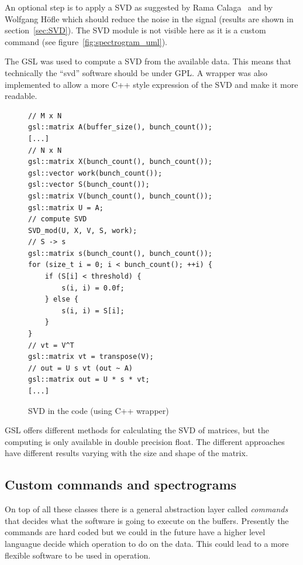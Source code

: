 An optional step is to apply a \gls{SVD} as suggested by Rama Calaga~\cite{PhysRevSTAB.7.042801} and by Wolfgang H{\"o}f\/le\cite{HofleChamonix12} which should reduce the noise in the signal (results are shown in section~\ref{sec:SVD}). The \gls{SVD} module is not visible here as it is a custom command (see figure~\ref{fig:spectrogram_uml}).

The \gls{GSL} was used to compute a SVD from the available data. This means that technically the ``svd'' software should be under \gls{GPL}. A wrapper was also implemented to allow a more C++ style expression of the \gls{SVD} and make it more readable.

\begin{figure}[H]
\centering
\caption{SVD in the code (using C++ wrapper)}
\begin{lstlisting}
// M x N
gsl::matrix A(buffer_size(), bunch_count());
[...]
// N x N
gsl::matrix X(bunch_count(), bunch_count());
gsl::vector work(bunch_count());
gsl::vector S(bunch_count());
gsl::matrix V(bunch_count(), bunch_count());
gsl::matrix U = A;
// compute SVD
SVD_mod(U, X, V, S, work);
// S -> s
gsl::matrix s(bunch_count(), bunch_count());
for (size_t i = 0; i < bunch_count(); ++i) {
	if (S[i] < threshold) {
		s(i, i) = 0.0f;
	} else {
		s(i, i) = S[i];
	}
}
// vt = V^T
gsl::matrix vt = transpose(V);
// out = U s vt (out ~ A)
gsl::matrix out = U * s * vt;
[...]
\end{lstlisting}
\end{figure}

\Gls{GSL} offers different methods for calculating the \gls{SVD} of matrices, but the computing is only available in double precision float. The different approaches have different results varying with the size and shape of the matrix.

\subsection{Custom commands and spectrograms}

On top of all these classes there is a general abstraction layer called \emph{commands} that decides what the software is going to execute on the buffers. Presently the commands are hard coded but we could in the future have a higher level languague decide which operation to do on the data. This could lead to a more flexible software to be used in operation.

